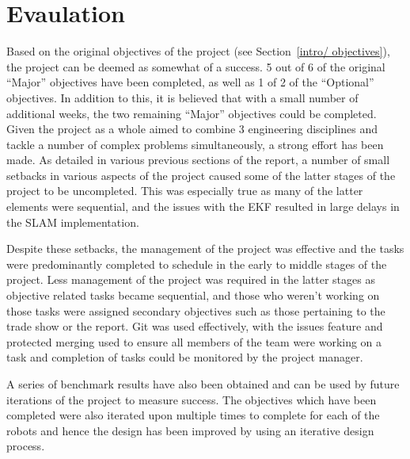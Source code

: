 
\chapter{Evaulation}\label{eval}
Based on the original objectives of the project (see Section~\ref{intro/
objectives}), the project can be deemed as somewhat of a success. 5 out of 6 of 
the original ``Major'' objectives have been completed, as well as 1 of 2 of 
the ``Optional'' objectives. In addition to this, it is believed that with a 
small number of additional weeks, the two remaining ``Major'' objectives could 
be completed. Given the project as a whole aimed to combine 3 engineering 
disciplines and tackle a number of complex problems simultaneously, a strong 
effort has been made. 
As detailed in various previous sections of the report, a number of small setbacks in 
various aspects of the project caused some of the latter stages of the project to be 
uncompleted. This was especially true as many of the latter elements were sequential, 
and the issues with the EKF resulted in large delays in the SLAM implementation. 

Despite these setbacks, the management of the project was effective and the  tasks were predominantly completed to schedule in the early to middle 
stages of the project. Less management of the project was required in the latter 
stages as objective related tasks became sequential, and those who weren't 
working on those tasks were assigned secondary objectives such as those 
pertaining to the trade show or the report. Git was used effectively, with the 
issues feature and protected merging used to ensure all members of the team were 
working on a task and completion of tasks could be monitored by the project 
manager. 

A series of benchmark results have also been obtained and can be used by future 
iterations of the project to measure success. The 
objectives which have been completed were also iterated upon multiple times to 
complete for each of the robots and hence the design has 
been improved by using an iterative design process. 

